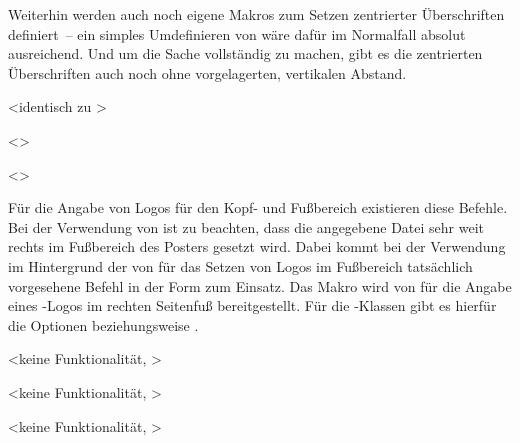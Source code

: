 \begin{DeclareEntity}{}
\begin{Declaration}
\begin{Declaration}
\begin{Declaration}
\begin{Declaration}
Weiterhin werden auch noch eigene Makros zum Setzen zentrierter Überschriften 
definiert~-- ein simples Umdefinieren von  wäre dafür im 
Normalfall absolut ausreichend. Und um die Sache vollständig zu machen, gibt es 
die zentrierten Überschriften auch noch ohne vorgelagerten, vertikalen Abstand.
\end{Declaration}
\end{Declaration}
\end{Declaration}
\end{Declaration}

\begin{Declaration}
  {}
  <identisch zu >
\begin{Declaration}
  {}
  <>
\begin{Declaration}
  {}
  <>
\printdeclarationlist

Für die Angabe von Logos für den Kopf- und Fußbereich existieren diese Befehle. 
Bei der Verwendung von  ist zu 
beachten, dass die angegebene Datei sehr weit rechts im Fußbereich des Posters 
gesetzt wird. Dabei kommt bei der Verwendung im Hintergrund der von \TUDScript 
für das Setzen von Logos im Fußbereich tatsächlich vorgesehene Befehl in der 
Form 
zum Einsatz. Das Makro  wird von  für 
die Angabe eines \DDC-Logos im rechten Seitenfuß bereitgestellt. Für die 
\TUDScript-Klassen gibt es hierfür die Optionen  beziehungsweise 
.
\end{Declaration}
\end{Declaration}
\end{Declaration}

\begin{Declaration}
  {}
  <keine Funktionalität, >
\begin{Declaration}
  {}
  <keine Funktionalität, >
\begin{Declaration}
  {}
  <keine Funktionalität, >
\printdeclarationlist


\end{Declaration}
\end{Declaration}
\end{Declaration}
\end{DeclareEntity}
